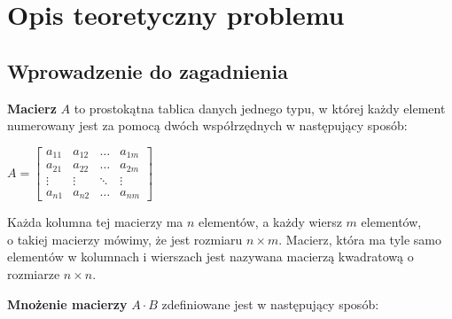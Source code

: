 \documentclass[11pt]{article}
\begin{document}
\section{Opis teoretyczny problemu}
\subsection{Wprowadzenie do zagadnienia}

\textbf{Macierz} $A$ to prostokątna tablica danych jednego typu, w której każdy element numerowany jest za pomocą dwóch współrzędnych w następujący sposób:
\begin{center}
\begin{math}
A = 
\begin{bmatrix}
    a_{11} & a_{12} & \dots  & a_{1m} \\
    a_{21} & a_{22} & \dots  & a_{2m} \\
    \vdots & \vdots & \ddots & \vdots \\
    a_{n1} & a_{n2} & \dots  & a_{nm}
\end{bmatrix}
\end{math}
\end{center}
Każda kolumna tej macierzy ma $n$ elementów, a każdy wiersz $m$ elementów,\\ o takiej macierzy mówimy, że jest rozmiaru $n \times m$. Macierz, która ma tyle samo elementów w kolumnach i wierszach jest nazywana macierzą kwadratową o rozmiarze $n \times n$.

\textbf{Mnożenie macierzy} $A \cdot B$ zdefiniowane jest w następujący sposób:
\end{document}
